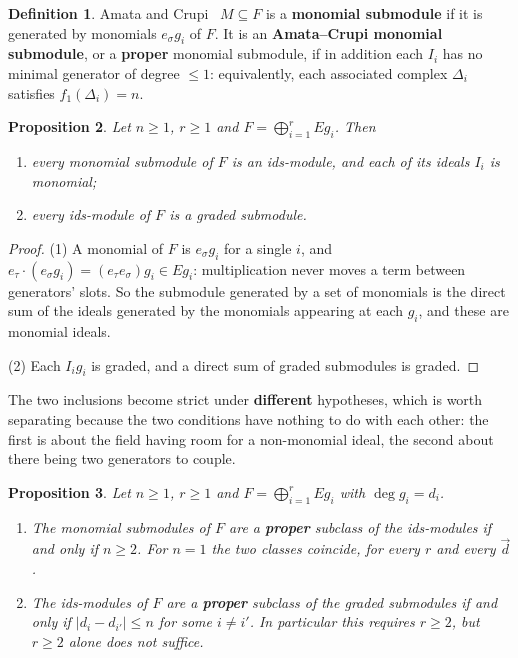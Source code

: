 \documentclass[11pt, a4paper, abstract=yes]{scrartcl}
\theoremstyle{definition}
\newtheorem{definition}{Definition}
\theoremstyle{remark}
\theoremstyle{plain}
\newtheorem{proposition}[definition]{Proposition}
\newcommand{\leannone}{\tikz[baseline=-0.6ex]\draw[leannone,line width=0.6pt] (0,0) circle (0.55ex);}
\newcommand{\leanmark}[1]{\leavevmode{\reversemarginpar\marginnote{\raggedleft#1}}}
\begin{document}
\begin{definition}
Amata and Crupi~\cite[Definition 2.1]{AmataCrupi2020} \(M\subseteq F\) is a \textbf{monomial submodule} if it is generated
by monomials \(e_\sigma g_i\) of \(F\). It is an \textbf{Amata--Crupi monomial submodule}, or a \textbf{proper}
monomial submodule, if in addition each \(I_i\) has no minimal generator of degree \(\le1\):
equivalently, each associated complex \(\Delta_i\) satisfies \(f_1(\Delta_i)=n\).
\label{def-monomial-submodule}
\end{definition}

\begin{proposition}
\leanmark{\leannone}Let \(n\ge1\), \(r\ge1\) and \(F=\bigoplus_{i=1}^rEg_i\). Then
\begin{enumerate}
\item every monomial submodule of \(F\) is an ids-module, and each of its ideals \(I_i\) is monomial;
\item every ids-module of \(F\) is a graded submodule.
\end{enumerate}
\label{prop-hierarchy}
\end{proposition}

\begin{proof}
(1) A monomial of \(F\) is \(e_\sigma g_i\) for a single \(i\), and
\(e_\tau\cdot(e_\sigma g_i)=(e_\tau e_\sigma)g_i\in Eg_i\): multiplication never moves a term between
generators' slots. So the submodule generated by a set of monomials is the direct sum of the ideals
generated by the monomials appearing at each \(g_i\), and these are monomial ideals.

(2) Each \(I_ig_i\) is graded, and a direct sum of graded submodules is graded.
\end{proof}

The two inclusions become strict under \textbf{different} hypotheses, which is worth separating because the
two conditions have nothing to do with each other: the first is about the field having room for a
non-monomial ideal, the second about there being two generators to couple.

\begin{proposition}
\leanmark{\leannone}Let \(n\ge1\), \(r\ge1\) and \(F=\bigoplus_{i=1}^rEg_i\) with \(\deg g_i=d_i\).
\begin{enumerate}
\item The monomial submodules of \(F\) are a \textbf{proper} subclass of the ids-modules if and only if
\(n\ge2\). For \(n=1\) the two classes coincide, for every \(r\) and every \(\vec d\).
\item The ids-modules of \(F\) are a \textbf{proper} subclass of the graded submodules if and only if
\(\lvert d_i-d_{i'}\rvert\le n\) for some \(i\ne i'\). In particular this requires \(r\ge2\), but
\(r\ge2\) alone does not suffice.
\end{enumerate}
\label{prop-hierarchy-strict}
\end{proposition}
\end{document}

